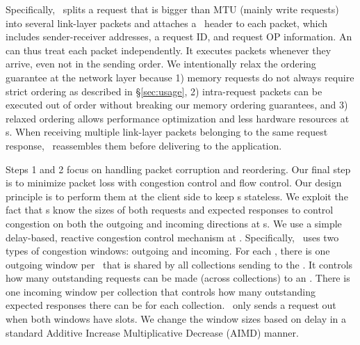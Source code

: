 Specifically, \syslib\ splits a request that is bigger than MTU (mainly write requests) into several link-layer packets
and attaches a \sys\ header to each packet, which includes sender-receiver addresses, a request ID, and request OP information.
An \MN{} can thus treat each packet independently.
It executes packets whenever they arrive, even not in the sending order.
We intentionally relax the ordering guarantee at the network layer
because 1) memory requests do not always require strict ordering as described in \S\ref{sec:usage},
2) intra-request packets can be executed out of order without breaking our memory ordering guarantees,
and 3) relaxed ordering allows performance optimization and less hardware resources at \MN{}s.
When receiving multiple link-layer packets belonging to the same request response, 
\syslib\ reassembles them before delivering to the application.


Steps 1 and 2 focus on handling packet corruption and reordering.
Our final step is to minimize packet loss with congestion control and flow control.
Our design principle is to perform them at the client side to keep \MN{}s stateless.
We exploit the fact that \CN{}s know the sizes of both requests and expected responses
to control congestion on both the outgoing and incoming directions at \CN{}s.
We use a simple delay-based, reactive congestion control mechanism at \syslib.
Specifically, \syslib\ uses two types of congestion windows: outgoing and incoming.
For each \CN, there is one outgoing window per \MN\ that is shared by all collections sending to the \MN.
It controls how many outstanding requests can be made (across collections) to an \MN.
There is one incoming window per collection that controls how many outstanding expected responses there can be for each collection.
\syslib\ only sends a request out when both windows have slots.
We change the window sizes based on delay in a standard Additive Increase Multiplicative Decrease (AIMD) manner.



